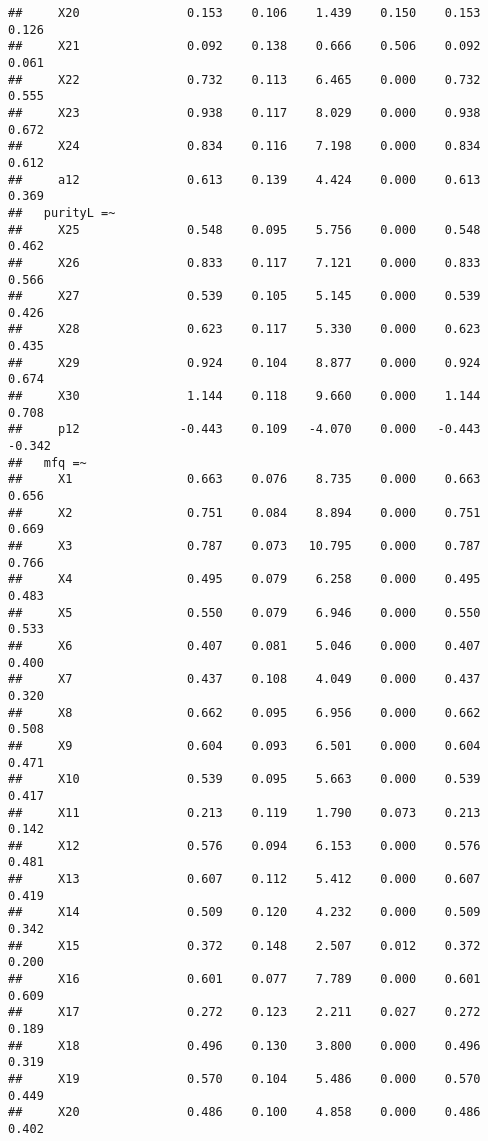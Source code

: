 \documentclass[english,man]{apa6}
\theoremstyle{definition}
\theoremstyle{definition}
\theoremstyle{definition}
\theoremstyle{remark}
\begin{document}
\begin{verbatim}
##     X20               0.153    0.106    1.439    0.150    0.153    0.126
##     X21               0.092    0.138    0.666    0.506    0.092    0.061
##     X22               0.732    0.113    6.465    0.000    0.732    0.555
##     X23               0.938    0.117    8.029    0.000    0.938    0.672
##     X24               0.834    0.116    7.198    0.000    0.834    0.612
##     a12               0.613    0.139    4.424    0.000    0.613    0.369
##   purityL =~                                                            
##     X25               0.548    0.095    5.756    0.000    0.548    0.462
##     X26               0.833    0.117    7.121    0.000    0.833    0.566
##     X27               0.539    0.105    5.145    0.000    0.539    0.426
##     X28               0.623    0.117    5.330    0.000    0.623    0.435
##     X29               0.924    0.104    8.877    0.000    0.924    0.674
##     X30               1.144    0.118    9.660    0.000    1.144    0.708
##     p12              -0.443    0.109   -4.070    0.000   -0.443   -0.342
##   mfq =~                                                                
##     X1                0.663    0.076    8.735    0.000    0.663    0.656
##     X2                0.751    0.084    8.894    0.000    0.751    0.669
##     X3                0.787    0.073   10.795    0.000    0.787    0.766
##     X4                0.495    0.079    6.258    0.000    0.495    0.483
##     X5                0.550    0.079    6.946    0.000    0.550    0.533
##     X6                0.407    0.081    5.046    0.000    0.407    0.400
##     X7                0.437    0.108    4.049    0.000    0.437    0.320
##     X8                0.662    0.095    6.956    0.000    0.662    0.508
##     X9                0.604    0.093    6.501    0.000    0.604    0.471
##     X10               0.539    0.095    5.663    0.000    0.539    0.417
##     X11               0.213    0.119    1.790    0.073    0.213    0.142
##     X12               0.576    0.094    6.153    0.000    0.576    0.481
##     X13               0.607    0.112    5.412    0.000    0.607    0.419
##     X14               0.509    0.120    4.232    0.000    0.509    0.342
##     X15               0.372    0.148    2.507    0.012    0.372    0.200
##     X16               0.601    0.077    7.789    0.000    0.601    0.609
##     X17               0.272    0.123    2.211    0.027    0.272    0.189
##     X18               0.496    0.130    3.800    0.000    0.496    0.319
##     X19               0.570    0.104    5.486    0.000    0.570    0.449
##     X20               0.486    0.100    4.858    0.000    0.486    0.402

\end{verbatim}
\end{document}
